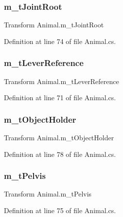 \subsubsection{\texorpdfstring{m\+\_\+t\+Joint\+Root}{m\_tJointRoot}}
{\footnotesize\ttfamily Transform Animal.\+m\+\_\+t\+Joint\+Root}



Definition at line 74 of file Animal.\+cs.

\mbox{\label{class_animal_a960e8ba99fbe90ef77f4937a60c473e8}} 
\subsubsection{\texorpdfstring{m\+\_\+t\+Lever\+Reference}{m\_tLeverReference}}
{\footnotesize\ttfamily Transform Animal.\+m\+\_\+t\+Lever\+Reference}



Definition at line 71 of file Animal.\+cs.

\mbox{\label{class_animal_a14776da7c67e6a28ea9ac2145d34c815}} 
\subsubsection{\texorpdfstring{m\+\_\+t\+Object\+Holder}{m\_tObjectHolder}}
{\footnotesize\ttfamily Transform Animal.\+m\+\_\+t\+Object\+Holder}



Definition at line 78 of file Animal.\+cs.

\mbox{\label{class_animal_a1fa3aebf72a7982519c84f4fff4c2fe6}} 
\subsubsection{\texorpdfstring{m\+\_\+t\+Pelvis}{m\_tPelvis}}
{\footnotesize\ttfamily Transform Animal.\+m\+\_\+t\+Pelvis}



Definition at line 75 of file Animal.\+cs.

